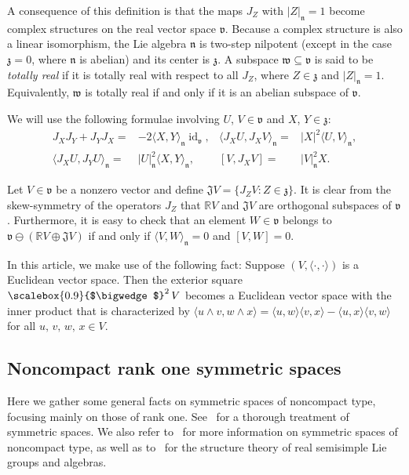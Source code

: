 \documentclass[12pt, a4paper]{amsart}
\newcommand{\g}{\mathfrak}
\newcommand{\R}{\mathbb{R}}
\newcommand{\id}{\operatorname{id}}
\newcommand{\ext}[1]{\ensuremath{\scalebox{0.9}{$\bigwedge$}^{#1}\,}}
\theoremstyle{definition}
\begin{document}
A consequence of this definition is that the maps $J_Z$ with $\lvert Z \rvert_{\g{n}} = 1$ become complex structures on the real vector space $\g{v}$.
Because a complex structure is also a linear isomorphism, the Lie algebra $\g{n}$ is two-step nilpotent (except in the case $\g{z}=0$, where $\g{n}$ is abelian) and its center is $\g{z}$.
A subspace $\g{w}\subseteq \g{v}$ is said to be \textit{totally real} if it is totally real with respect to all $J_Z$, where $Z\in\g{z}$ and $\lvert Z \rvert_{\g{n}} = 1$.
Equivalently, $\g{w}$ is totally real if and only if it is an abelian subspace of $\g{v}$.

We will use the following formulae involving $U$, $V\in\g{v}$ and $X$, $Y\in \g{z}$:
\begin{align*}
J_X J_Y + J_Y J_X ={}
& -2\langle X, Y \rangle_{\g{n}} \id_{\g{v}}, 
& \langle J_X U, J_X V \rangle_{\g{n}} ={}
& \lvert X \rvert ^2 \langle U, V \rangle_{\g{n}}, \\
\langle J_X U, J_Y U \rangle_{\g{n}} ={}
& \lvert U \rvert_{\g{n}}^2 \langle X, Y \rangle_{\g{n}}, 
& [V,J_X V]={}& \lvert V \rvert_{\g{n}}^2 X.
\end{align*}

Let $V\in \g{v}$ be a nonzero vector and define $\g{J}V=\{J_Z V\colon Z\in \g{z}\}$.
It is clear from the skew-symmetry of the operators $J_Z$ that $\R V$ and $\g{J}V$ are orthogonal subspaces of $\g{v}$.
Furthermore, it is easy to check that an element $W\in \g{v}$ belongs to $\g{v}\ominus(\R V\oplus \g{J}V)$ if and only if $\langle V,W \rangle_{\g{n}} = 0$ and $[V,W]=0$.

In this article, we make use of the following fact:
Suppose $(V,\langle\cdot ,\cdot\rangle)$ is a Euclidean vector space.
Then the exterior square $\ext{2}V$ becomes a Euclidean vector space
with the inner product that is characterized by
$
\langle u\wedge v, w\wedge x \rangle
=
\langle u,w\rangle\langle v,x\rangle-\langle u,x\rangle\langle v,w\rangle
$
for all $u,\,v,\,w,\,x\in V$.

\subsection{Noncompact rank one symmetric spaces}\label{subsec:rank one}\hfill

Here we gather some general facts on symmetric spaces of noncompact type, focusing mainly on those of rank one.
See~\cite{Helgason01} for a thorough treatment of symmetric spaces.
We also refer to~\cite{Eberlein96} for more information on symmetric spaces of noncompact type, as well as to~\cite[Chapter~6]{knapp} for the structure theory of real semisimple Lie groups and algebras.
\end{document}
